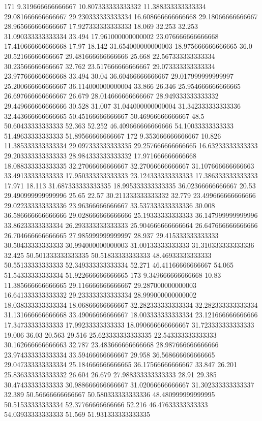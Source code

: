 171 9.319666666666667 10.807333333333332 11.388333333333334 29.081666666666667 29.230333333333334 16.608666666666668 29.18066666666667 28.965666666666667 17.927333333333333 18.069 32.253 32.253 31.090333333333334 33.494 17.961000000000002 23.076666666666668 17.410666666666668 17.97 18.142 31.654000000000003 18.975666666666665 36.0 20.52166666666667 29.481666666666666 25.668 22.567333333333334 30.23566666666667 32.762 23.517666666666667 29.073333333333334 23.977666666666668 33.494 30.04 36.60466666666667 29.017999999999997 25.200666666666667 36.114000000000004 33.866 26.346 25.954666666666665 26.697666666666667 26.679 28.014666666666667 28.949333333333332 29.449666666666666 30.528 31.007 31.044000000000004 31.342333333333336 32.443666666666665 50.45166666666667 50.46966666666667 48.5 50.60433333333333 52.363 52.252 46.409666666666666 54.10033333333333 51.49633333333333 51.89566666666667
172 9.353666666666667 10.826 11.385333333333334 29.097333333333335 29.257666666666665 16.63233333333333 29.203333333333333 28.984333333333332 17.971666666666668 18.088333333333335 32.27066666666667 32.27066666666667 31.107666666666663 33.49133333333333 17.950333333333333 23.124333333333333 17.386333333333333 17.971 18.113 31.687333333333335 18.995333333333335 36.02366666666667 20.53 29.490999999999996 25.65 22.57 30.211333333333332 32.779 23.499666666666666 29.022333333333336 23.96366666666667 33.537333333333336 30.008 36.586666666666666 29.028666666666666 25.19333333333333 36.147999999999996 33.86233333333334 26.293333333333333 25.904666666666664 26.647666666666666 26.704666666666665 27.985999999999997 28.937 29.415333333333333 30.50433333333333 30.994000000000003 31.00133333333333 31.310333333333336 32.425 50.501333333333335 50.51833333333333 48.46933333333333 50.55133333333333 52.349333333333334 52.271 46.41166666666667 54.065 51.54333333333334 51.922666666666665
173 9.349666666666668 10.83 11.385666666666665 29.116666666666667 29.287000000000003 16.641333333333332 29.233333333333334 28.999000000000002 18.038333333333334 18.06866666666667 32.282333333333334 32.282333333333334 31.131666666666668 33.49066666666667 18.003333333333334 23.121666666666666 17.34733333333333 17.99233333333333 18.090666666666667 31.723333333333333 19.006 36.03 20.563 29.516 25.623333333333335 22.543333333333333 30.162666666666663 32.787 23.483666666666668 28.987666666666666 23.974333333333334 33.59466666666667 29.958 36.568666666666665 29.047333333333334 25.184666666666665 36.17566666666667 33.847 26.201 25.836333333333332 26.604 26.679 27.988333333333333 28.91 29.385 30.47433333333333 30.988666666666667 31.02066666666667 31.302333333333337 32.389 50.56666666666667 50.580333333333336 48.480999999999995 50.51533333333334 52.37766666666666 52.216 46.47633333333333 54.03933333333333 51.569 51.931333333333335
